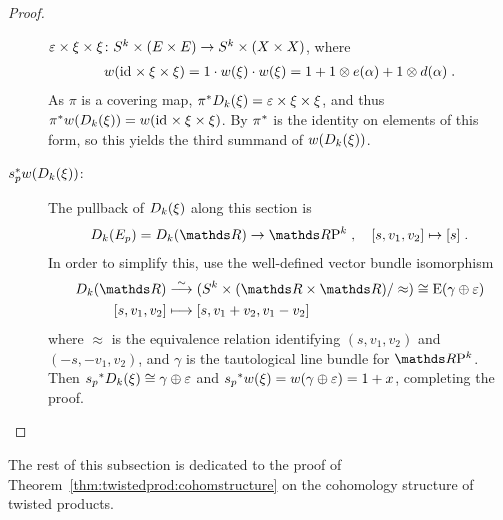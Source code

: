 \begin{Cor}
\begin{proof}
\begin{description}
      $\varepsilon\times\xi\times\xi\colon
      S^{k}\times(E\times E)\to S^{k}\times(X\times X)$, where
      \begin{gather*}
        {w}(\mathrm{id}_{}\times\xi\times\xi)
        = 1\cdot {w}(\xi)\cdot{w}(\xi)
        = 1 + 1\otimes e(\alpha) + 1\otimes d(\alpha)
        \;.
      \end{gather*}
      As $\pi$ is a covering map,
      ${\pi}^*D_{k}({\xi})=\varepsilon\times\xi\times\xi$,
      and thus
      ${\pi}^*{w}(D_{k}({\xi}))={w}(\mathrm{id}_{}\times\xi\times\xi)$.
      By  ${\pi}^*$ is the identity on
      elements of this form, so this yields the third
      summand of ${w}(D_{k}({\xi}))$.
    \item[${s}^*_p {w}(D_{k}({\xi}))$:]
      The pullback of $D_{k}({\xi})$ along this section is
      \begin{gather*}
        \Twistedprod{k}{E_p}=\Twistedprod{k}{\R}\to \RP k
        \;,\quad
        [s, v_1,v_2] \mapsto [s]
        \;.
      \end{gather*}
      In order to simplify this, use the well-defined vector bundle
      isomorphism
      \begin{align*}
        \Twistedprod{k}{\R}
        &\overset{\sim}\longto
          (\Twistedprodcovspace{k}{\R}/\approx)
          \cong \E{(\gamma\oplus\trivbdl)} \\
        [s, v_1, v_2]
        &\longmapsto
          [s, v_1+v_2, v_1-v_2]
      \end{align*}
      where $\approx$ is the equivalence relation identifying
      $(s,v_1,v_2)$ and $(-s,-v_1,v_2)$, and
      $\gamma$ is the tautological line bundle for $\RP k$.
      Then ${s_p}^*D_{k}({\xi}) \cong
      \gamma\oplus\varepsilon$ and ${s_p}^*{w}(\xi) =
      {w}(\gamma\oplus\varepsilon) = 1+x$, completing the proof.
      \qedhere
    \end{description}
  \end{proof}
\end{Cor}

The rest of this subsection is dedicated to the proof of
Theorem~\ref{thm:twistedprod:cohomstructure} on the cohomology
structure of twisted products.

